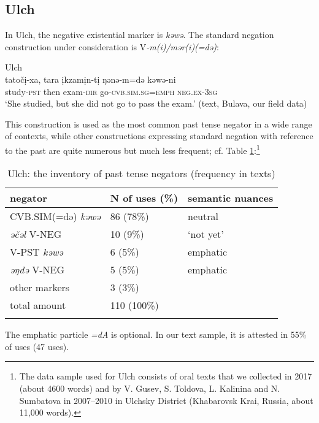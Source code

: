 \documentclass[output=paper]{langscibook}
\begin{document}
\subsection{Ulch}\label{sec:T5.4}

In Ulch, the negative existential marker is \textit{kəwə}. The standard negation construction under consideration is V\textit{-m(i)/mər(i)(=də)}:

\ea Ulch \label{ex:T16}\\
	\gll tatočị-xa,	tara	ịkzamịn-tị	ŋənə-m=də	kəwə-ni\\
	study-\textsc{pst}	then	exam-\textsc{dir}	go-\textsc{cvb.sim.sg=emph}	\textsc{neg.ex-3sg}\\
	\glt `She studied, but she did not go to pass the exam.' (text, Bulava, our field data)
\z

This construction is used as the most common past tense negator in a wide range of contexts, while other constructions expressing standard negation with reference to the past are quite numerous but much less frequent; cf. Table \ref{tab:T5}:\footnote{The data sample used for Ulch consists of oral texts that we collected in 2017 (about 4600 words) and by V. Gusev, S. Toldova, L. Kalinina and N. Sumbatova in 2007–2010 in Ulchsky District (Khabarovsk Krai, Russia, about 11,000 words).}

\begin{table}[!h]
    \caption{Ulch: the inventory of past tense negators (frequency in texts)}
    \label{tab:T5}
    \begin{tabular}{@{}lll@{}}
    \lsptoprule
    negator & N of uses (\%) & semantic nuances \\ \midrule
    \rowcolor[HTML]{EFEFEF} 
    CVB.SIM(=də) \textit{kəwə} & 86 (78\%) & neutral \\
    \textit{əčəl} V-NEG & 10 (9\%) & ‘not yet’ \\
    V-PST \textit{kəwə} & 6 (5\%) & emphatic \\
    \textit{əŋdə} V-NEG & 5 (5\%) & emphatic \\
    other markers & 3 (3\%) &  \\ \midrule
    total amount & 110 (100\%) &  \\ \lspbottomrule
    \end{tabular}
\end{table}



The emphatic particle \textit{=dA} is optional. In our text sample, it is attested in 55\% of uses (47 uses).
\end{document}
